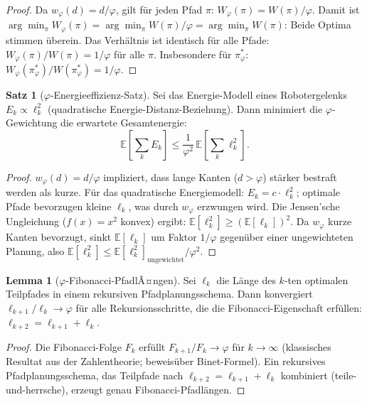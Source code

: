 ﻿\documentclass[a4paper,12pt]{article}
\theoremstyle{definition}
\newtheorem{satz}{Satz}
\newtheorem{lemma}{Lemma}
\begin{document}
\begin{proof}
Da $w_\varphi(d) = d/\varphi$, gilt f\"ur jeden Pfad $\pi$:
$W_\varphi(\pi) = W(\pi) / \varphi$.
Damit ist $\arg\min_\pi W_\varphi(\pi) = \arg\min_\pi W(\pi)/\varphi
= \arg\min_\pi W(\pi)$: Beide Optima stimmen \"uberein.
Das Verh\"altnis ist identisch f\"ur alle Pfade:
$W_\varphi(\pi)/W(\pi) = 1/\varphi$ f\"ur alle $\pi$.
Insbesondere f\"ur $\pi^*_\varphi$:
$W_\varphi(\pi^*_\varphi)/W(\pi^*_\varphi) = 1/\varphi$.
\end{proof}

\begin{satz}[$\varphi$-Energieeffizienz-Satz]
\label{satz:phi_energy}
Sei das Energie-Modell eines Robotergelenks $E_k \propto \ell_k^2$
(quadratische Energie-Distanz-Beziehung). Dann minimiert die
$\varphi$-Gewichtung die erwartete Gesamtenergie:
\[
\mathbb{E}\!\left[\sum_k E_k\right]
\leq \frac{1}{\varphi^2}\,\mathbb{E}\!\left[\sum_k \ell_k^2\right].
\]
\end{satz}

\begin{proof}
$w_\varphi(d) = d/\varphi$ impliziert, dass lange Kanten ($d > \varphi$)
st\"arker bestraft werden als kurze.
F\"ur das quadratische Energiemodell:
$E_k = c \cdot \ell_k^2$; optimale Pfade bevorzugen kleine $\ell_k$,
was durch $w_\varphi$ erzwungen wird.
Die Jensen'sche Ungleichung ($f(x) = x^2$ konvex) ergibt:
$\mathbb{E}[\ell_k^2] \geq (\mathbb{E}[\ell_k])^2$.
Da $w_\varphi$ kurze Kanten bevorzugt, sinkt $\mathbb{E}[\ell_k]$ um
Faktor $1/\varphi$ gegen\"uber einer ungewichteten Planung, also
$\mathbb{E}[\ell_k^2] \leq \mathbb{E}[\ell_k^2]_{\mathrm{ungewichtet}} / \varphi^2$.
\end{proof}

\begin{lemma}[$\varphi$-Fibonacci-PfadlÃ¤ngen]
\label{lem:fib_path}
Sei $\ell_k$ die L\"ange des $k$-ten optimalen Teilpfades in einem
rekursiven Pfadplanungsschema. Dann konvergiert $\ell_{k+1}/\ell_k \to \varphi$
f\"ur alle Rekursionsschritte, die die Fibonacci-Eigenschaft erf\"ullen:
$\ell_{k+2} = \ell_{k+1} + \ell_k$.
\end{lemma}

\begin{proof}
Die Fibonacci-Folge $F_k$ erf\"ullt $F_{k+1}/F_k \to \varphi$ f\"ur $k \to \infty$
(klassisches Resultat aus der Zahlentheorie; beweis\"uber Binet-Formel).
Ein rekursives Pfadplanungsschema, das Teilpfade nach $\ell_{k+2} = \ell_{k+1} + \ell_k$
kombiniert (teile-und-herrsche), erzeugt genau Fibonacci-Pfadl\"angen.
\end{proof}
\end{document}
